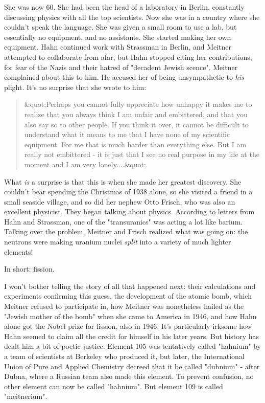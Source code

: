 She was now 60.  She had been the head of a laboratory in Berlin,
constantly discussing physics with all the top scientists.  Now she was
in a country where she couldn't speak the language.  She was given a
small room to use a lab, but essentially no equipment, and no
assistants.  She started making her own equipment.  Hahn continued work
with Strassman in Berlin, and Meitner attempted to collaborate from
afar, but Hahn stopped citing her contributions, for fear of the Nazis
and their hatred of "decadent Jewish scence".  Meitner
complained about this to him.  He accused her of being unsympathetic to
\emph{his} plight.  It's no surprise that she wrote to him:

\begin{quote}
 &quot;Perhaps you cannot fully appreciate how unhappy it makes me to 
 realize that you always think I am unfair and embittered, and that 
 you also say so to other people.  If you think it over, it cannot 
 be difficult to understand what it means to me that I have none of 
 my scientific equipment.  For me that is much harder than everything 
 else.  But I am really not embittered - it is just that I see no real 
 purpose in my life at the moment and I am very lonely....&quot;

\end{quote}
    

What \emph{is} a surprise is that this is when she made her greatest
discovery.  She couldn't bear spending the Christmas of 1938 alone, so
she visited a friend in a small seaside village, and so did her nephew
Otto Frisch, who was also an excellent physicist.  They began talking
about physics.  According to letters from Hahn and Strassman, one of the
"transuranics" was acting a lot like barium.  Talking over the
problem, Meitner and Frisch realized what was going on: the neutrons
were making uranium nuclei \emph{split} into a variety of much lighter
elements!

In short: fission.


I won't bother telling the story of all that happened next: their
calculations and experiments confirming this guess, the development of
the atomic bomb, which Meitner refused to participate in, how Meitner
was nonetheless hailed as the "Jewish mother of the bomb" when
she came to America in 1946, and how Hahn alone got the Nobel prize for
fission, also in 1946.  It's particularly irksome how Hahn seemed to
claim all the credit for himself in his later years.  But history has
dealt him a bit of poetic justice.  Element 105 was tentatively called
"hahnium" by a team of scientists at Berkeley who produced it,
but later, the International Union of Pure and Applied Chemistry decreed
that it be called "dubnium" - after Dubna, where a Russian
team also made this element.  To prevent confusion, no other element can
now be called "hahnium".  But element 109 is called
"meitnerium".

